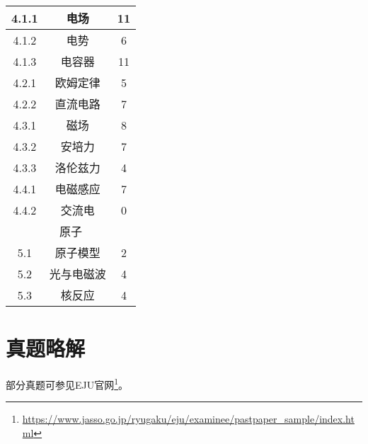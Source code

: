 \begin{center}
\begin{minipage}{0.48\textwidth}
\begin{tabular}{c|c|c}
            4.1.1&电场&11\\\hline
            4.1.2&电势&6\\\hline
            4.1.3&电容器&11\\\hline
            4.2.1&欧姆定律&5\\\hline
            4.2.2&直流电路&7\\\hline
            4.3.1&磁场&8\\\hline
            4.3.2&安培力&7\\\hline
            4.3.3&洛伦兹力&4\\\hline
            4.4.1&电磁感应&7\\\hline
            4.4.2&交流电&0\\\hline
            \multicolumn{3}{c}{原子}\\\hline
            5.1&原子模型&2\\\hline
            5.2&光与电磁波&4\\\hline
            5.3&核反应&4\\\hline
        \end{tabular}
    \end{minipage}
\end{center}

\chapter{真题略解}

部分真题可参见EJU官网\footnote{\url{https://www.jasso.go.jp/ryugaku/eju/examinee/pastpaper_sample/index.html}}。











